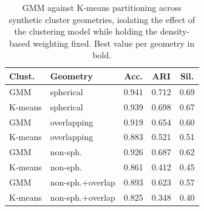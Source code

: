 \begin{table}[htbp]
	\begin{center}
		\caption{GMM against K-means partitioning across synthetic cluster geometries, isolating the effect of the clustering model while holding the density-based weighting fixed. Best value per geometry in bold.}
		\label{tab:nonspherical}
		\setlength{\tabcolsep}{3pt}
		\begin{tabular}{|l|l|c|c|c|}
			\hline
			\textbf{Clust.} & \textbf{Geometry} & \textbf{Acc.} & \textbf{ARI} & \textbf{Sil.} \\
			\hline
			GMM & spherical & 0.941 & 0.712 & 0.69 \\
			K-means & spherical & 0.939 & 0.698 & 0.67 \\
			GMM & overlapping & 0.919 & 0.654 & 0.60 \\
			K-means & overlapping & 0.883 & 0.521 & 0.51 \\
			GMM & non-sph. & 0.926 & 0.687 & 0.62 \\
			K-means & non-sph. & 0.861 & 0.412 & 0.45 \\
			GMM & non-sph.+overlap & 0.893 & 0.623 & 0.57 \\
			K-means & non-sph.+overlap & 0.825 & 0.348 & 0.40 \\
			\hline
		\end{tabular}
	\end{center}
\end{table}
